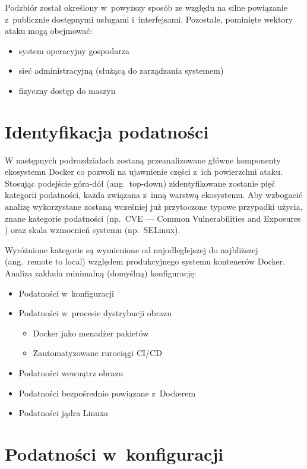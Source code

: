 Podzbiór został określony w~powyższy sposób ze względu na silne powiązanie z~publicznie dostępnymi usługami i~interfejsami. Pozostałe, pominięte wektory ataku mogą obejmować:

\begin{itemize}
    \item system operacyjny gospodarza
    \item sieć administracyjną (służącą do zarządzania systemem)
    \item fizyczny dostęp do maszyn
\end{itemize}

\section{Identyfikacja podatności}

W następnych podrozdziałach zostaną przeanalizowane główne komponenty ekosystemu Docker co pozwoli na ujawnienie części z~ich powierzchni ataku. Stosując podejście góra-dół (ang.~top-down) zidentyfikowane zostanie pięć kategorii podatności, każda związana z~inną warstwą ekosystemu. Aby wzbogacić analizę wykorzystane zostaną wcześniej już przytoczone typowe przypadki użycia, znane kategorie podatności (np.~CVE --- Common Vulnerabilities and Exposures \cite{MITREDockerVulnerabilityStatistics}) oraz skala wzmocnień systemu (np.~SELinux).

Wyróżnione kategorie są wymienione od najodleglejszej do najbliższej (ang.~remote to local) względem produkcyjnego systemu kontenerów Docker. Analiza zakłada minimalną (domyślną) konfigurację:

\begin{itemize}
    \item Podatności w~konfiguracji
    \item Podatności w~procesie dystrybucji obrazu
    \begin{itemize}
        \item Docker jako menadżer pakietów
        \item Zautomatyzowane rurociągi CI/CD
    \end{itemize}
    \item Podatności wewnątrz obrazu
    \item Podatności bezpośrednio powiązane z~Dockerem
    \item Podatności jądra Linuxa
\end{itemize}

\section{Podatności w~konfiguracji}

